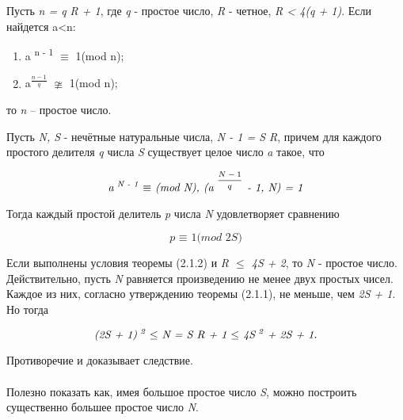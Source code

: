   \begin{theorem}[Диемитко]
      Пусть \textit{n = q R + 1}, где \textit{q} - простое число, \textit{R} - четное, \textit{R < 4(q + 1)}. Если найдется a<n:
      
	\begin{enumerate}
	 \item a\textsuperscript{ n - 1} {$\equiv$} 1(mod n);
	 \item a\textsuperscript{ {$\frac{n - 1}{q}$}} {$\ncong$} 1(mod n); 
	\end{enumerate}
	
      то \textit{n} – простое число.
  \end{theorem}


  \begin{theorem}
  
      Пусть \textit{N, S} - нечётные натуральные числа, \textit{N - 1 = S R}, причем для каждого простого делителя \textit{q}  
  числа \textit{S} существует целое число \textit{a} такое, что

    \begin{equation}
      \textit{a\textsuperscript{ N - 1} {$\equiv$} (mod N), (a\textsuperscript{ {$\frac{N - 1}{q}$}} - 1, N) = 1}
    \end{equation}

  Тогда каждый простой делитель \textit{p} числа \textit{N} удовлетворяет сравнению

    \begin{equation}
      \textit{p {$\equiv$} 1(mod 2S)}
    \end{equation}  
  
  \end{theorem}
  
  \begin{cons} 
    Если выполнены условия теоремы (2.1.2) и \textit{R {$\le$} 4S + 2}, то \textit{N} - простое число. Действительно, пусть \textit{N}  
  равняется произведению не менее двух простых чисел. Каждое из них, согласно утверждению теоремы (2.1.1), не меньше, чем \textit{2S + 1}. Но тогда 

    \begin{equation}
      \textit{(2S + 1)\textsuperscript{ 2} {$ \le $} N = S R + 1 {$ \le $} 4S\textsuperscript{ 2} + 2S + 1.}
    \end{equation}

    Противоречие и доказывает следствие.
  \end{cons}
  
  \paragraph{} Полезно показать как, имея большое простое число \textit{S}, можно построить существенно большее простое число \textit{N}. 
  
